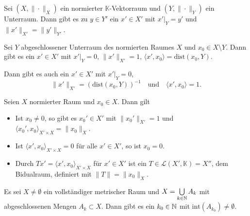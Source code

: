 \documentclass{cheat-sheet}
\newcommand{\K}{\mathbb{K}}
\newcommand{\dist}{\mathrm{dist}} %
\begin{document}
\begin{satz}
  Sei $(X, \|\cdot\|_X)$ ein normierter $\K$-Vektorraum und $(Y, \|\cdot\|_Y)$ ein Unterraum. Dann gibt es zu $y \in Y'$ ein $x' \in X'$ mit $x'|_Y = y'$ und $\|x'\|_{X'} = \|y'\|_{Y'}$.
\end{satz}

\begin{satz}
  Sei $Y$ abgeschlossener Unterraum des normierten Raumes $X$ und $x_0 \in X \setminus Y$. Dann gibt es ein $x' \in X'$ mit $x'|_Y = 0$, $\|x'\|_{X'} = 1$, $\langle x', x_0 \rangle = \dist(x_0, Y)$.
\end{satz}

\begin{bem}
  Dann gibt es auch ein $x' \in X'$ mit $x'|_Y = 0$,
  \[ \|x'\|_{X'} = (\dist(x_0, Y))^{-1} \quad \text{und} \quad \langle x', x_0 \rangle = 1. \]
\end{bem}


\begin{satz}
  Seien $X$ normierter Raum und $x_0 \in X$. Dann gilt
  \begin{itemize}
    \item  Ist $x_0 \not= 0$, so gibt es $x_0' \in X'$ mit $\|x_0'\|_{X'} = 1$ und $\langle x_0', x_0 \rangle_{X' \times X} = \|x_0\|_X$.
    \item Ist $\langle x', x_0 \rangle_{X' \times X} = 0$ für alle $x' \in X'$, so ist $x_0 = 0$.
    \item Durch $Tx' = \langle x', x_0 \rangle_{X' \times X}$ für $x' \in X'$ ist ein $T \in \mathcal{L}(X', \K) = X''$, dem Bidualraum, definiert mit $\|T\| = \|x_0\|_X$.
  \end{itemize}
\end{satz}



\begin{satz}
  Es sei $X \not= \emptyset$ ein vollständiger metrischer Raum und $X = \bigcup_{k \in \N} A_k$ mit abgeschlossenen Mengen $A_k \subset X$. Dann gibt es ein $k_0 \in \mathbb{N}$ mit $\mathrm{int}(A_{k_0}) \not= \emptyset$.
\end{satz}
\end{document}
